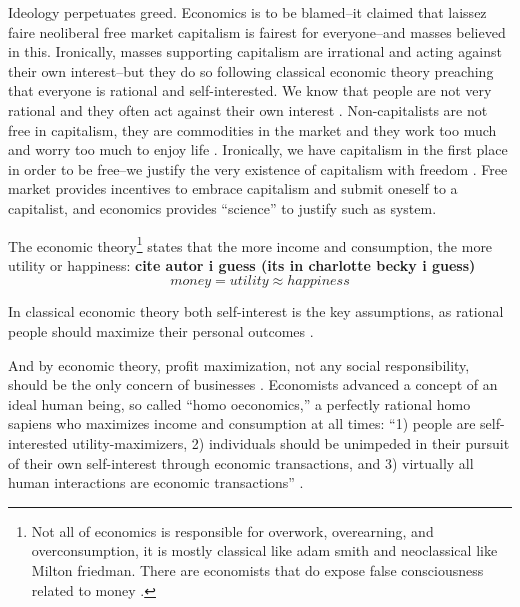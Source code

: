 \documentclass[10pt, letterpaper]{article}
\begin{document}
\begin{spacing}{1.8}
Ideology perpetuates greed. Economics is to be blamed--it claimed that
laissez faire neoliberal free market capitalism is fairest for everyone--and
masses believed in this. 
Ironically, masses supporting capitalism are irrational and acting against
their own interest--but they do so following classical
economic theory preaching that everyone is rational and self-interested. 
We know that people are not very rational and they often act against their own
interest \citep{akerlof10,ariely09,shiller15}. Non-capitalists are not
free in capitalism, they are commodities in the market and they work too much
and worry too much to enjoy life \citep{aokJap14}. Ironically, we
have capitalism in the first place in order to be free--we justify the very
existence of capitalism with freedom \citep{hayek14,friedman09,glaeser11B}. Free
market provides incentives to embrace capitalism and submit oneself to a
capitalist, and economics provides ``science'' to justify such as system.


The economic theory\footnote{Not all of economics is responsible for overwork, overearning, and
overconsumption, it is mostly classical like adam smith and neoclassical like
Milton friedman. There are economists that do expose false consciousness related to
money \citep[e.g,][]{kahneman06c}. %
} states that the more income and consumption, the
more utility or happiness: \textbf{cite autor i guess (its in charlotte becky i guess)}
\begin{equation}
money 
  = utility \approx happiness
\end{equation}

In classical economic theory both self-interest is the key assumptions, as rational people should
maximize their personal outcomes \citep{seuntjens15b}.%

And by economic theory, profit maximization, not any social responsibility,
should be the only concern of businesses \cite{friedman70}.
Economists advanced a concept of an ideal human being, so called ``homo oeconomics,'' a perfectly rational
homo sapiens who maximizes income and consumption at all times: %
``1) people are self-interested utility-maximizers, 2)
individuals should be unimpeded in their pursuit of their own self-interest
through economic transactions, and 3) virtually all human interactions are
economic transactions'' %
\citep{walker1992greed}.


\end{spacing}
\end{document}
